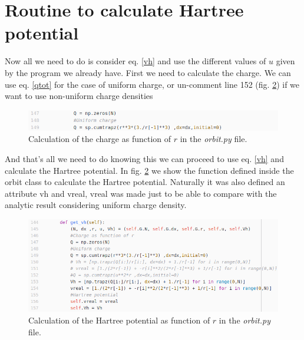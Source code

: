 \documentclass[12pt]{article}
\begin{document}
\section{Routine to calculate Hartree potential}
Now all we need to do is consider eq. \ref{vh} and use the different values of $u$ given by the program we already have. 
First we need to calculate the charge. We can use eq. \ref{qtot} for the case of uniform charge, or un-comment line 152 (fig. \ref{figvh}) if we want to use non-uniform charge densities
\begin{figure}[h!]
    \centering
   \includegraphics[width=\linewidth]{Q}
    \caption{Calculation of the charge as function of $r$ in the \textit{orbit.py} file. }
    \label{qcode}
\end{figure}
And that's all we need to do
knowing this we can proceed to use eq. \ref{vh} and calculate the Hartree potential. In fig. \ref{figvh} we show the function defined inside the orbit class to calculate the Hartree potential. Naturally it was also defined an attribute vh and vreal, vreal was made just to be able to compare with the analytic result considering uniform charge density.
\begin{figure}[h!]
    \centering
   \includegraphics[width=\linewidth]{vh}
    \caption{Calculation of the Hartree potential as function of $r$ in the \textit{orbit.py} file. }
    \label{figvh}
\end{figure}
\end{document}
